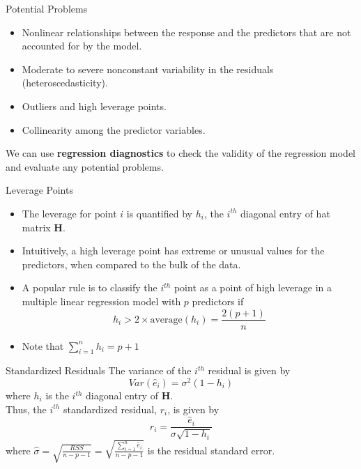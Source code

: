 \documentclass[10pt]{beamer}\usepackage[]{graphicx}\usepackage[]{color}
\begin{document}
\begin{frame}{Potential Problems}
\begin{itemize}
\item Nonlinear relationships between the response and the predictors that are not accounted for by the model.\\
\vspace{5pt}
\item Moderate to severe nonconstant variability in the residuals (heteroscedasticity).\\
\vspace{5pt}
\item Outliers and high leverage points.\\
\vspace{5pt}
\item Collinearity among the predictor variables.
\end{itemize}
\vspace{10pt}

We can use \textbf{regression diagnostics} to check the validity of the regression model and evaluate any potential problems.
\end{frame}

\begin{frame}{Leverage Points}
\begin{itemize}
\item The leverage for point $i$ is quantified by $h_i$, the $i^{th}$ diagonal entry of hat matrix $\bm{H}$.\\
\vspace{5pt}
\item Intuitively, a high leverage point has extreme or unusual values for the predictors, when compared to the bulk of the data.\\
\vspace{5pt}
\item A popular rule is to classify the $i^{th}$ point as a point of high leverage in a multiple linear regression model with $p$ predictors if
$$h_i > 2 \times \text{average$(h_i)$} = \frac{2(p+1)}{n}$$
\item Note that $\sum_{i=1}^n h_i = p+1$
\end{itemize}
\end{frame}

\begin{frame}{Standardized Residuals}
The variance of the $i^{th}$ residual is given by
$$Var(\hat{e}_i) = \sigma^2 (1-h_i)$$
where $h_i$ is the $i^{th}$ diagonal entry of $\bm{H}$.\\
\vspace{15pt}
Thus, the $i^{th}$ standardized residual, $r_i$, is given by
$$r_i = \frac{\hat{e}_i}{\hat{\sigma} \sqrt{1-h_i}}$$
where $\hat{\sigma} = \sqrt{\frac{RSS}{n-p-1}} = \sqrt{\frac{\sum_{i=1}^n \hat{e}_i}{n-p-1}}$ is the residual standard error.\\
\vspace{10pt}

\end{frame}
\end{document}
